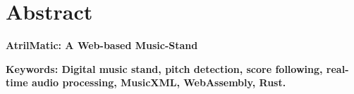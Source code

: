 \chapter*{Abstract}
\thispagestyle{plain}

\begin{center}
{\Large\bfseries
AtrilMatic: A Web-based Music-Stand
\par
}
\end{center}

\vspace{0.8cm}

\vfill

\begin{center}
\textbf{Keywords: Digital music stand, pitch detection,
score following, real-time audio processing, MusicXML, 
WebAssembly, Rust.}
\end{center}
